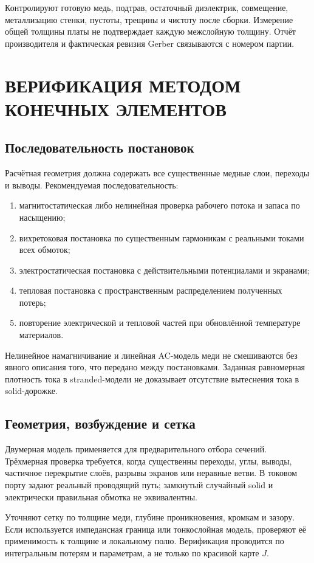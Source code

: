 \documentclass[14pt,a4paper]{extarticle}
\begin{document}
Контролируют готовую медь, подтрав, остаточный диэлектрик, совмещение, металлизацию стенки, пустоты, трещины и чистоту после сборки. Измерение общей толщины платы не подтверждает каждую межслойную толщину. Отчёт производителя и фактическая ревизия Gerber связываются с номером партии.

\section{ВЕРИФИКАЦИЯ МЕТОДОМ КОНЕЧНЫХ ЭЛЕМЕНТОВ}
\label{pl:fem}
\subsection{Последовательность постановок}
Расчётная геометрия должна содержать все существенные медные слои, переходы и выводы. Рекомендуемая последовательность:
\begin{enumerate}
\item магнитостатическая либо нелинейная проверка рабочего потока и запаса по насыщению;
\item вихретоковая постановка по существенным гармоникам с реальными токами всех обмоток;
\item электростатическая постановка с действительными потенциалами и экранами;
\item тепловая постановка с пространственным распределением полученных потерь;
\item повторение электрической и тепловой частей при обновлённой температуре материалов.
\end{enumerate}
Нелинейное намагничивание и линейная AC-модель меди не смешиваются без явного описания того, что передано между постановками. Заданная равномерная плотность тока в stranded-модели не доказывает отсутствие вытеснения тока в solid-дорожке.

\subsection{Геометрия, возбуждение и сетка}
Двумерная модель применяется для предварительного отбора сечений. Трёхмерная проверка требуется, когда существенны переходы, углы, выводы, частичное перекрытие слоёв, разрывы экранов или неравные ветви. В токовом порту задают реальный проводящий путь; замкнутый случайный solid и электрически правильная обмотка не эквивалентны.

Уточняют сетку по толщине меди, глубине проникновения, кромкам и зазору. Если используется импедансная граница или тонкослойная модель, проверяют её применимость к толщине и локальному полю. Верификация проводится по интегральным потерям и параметрам, а не только по красивой карте $J$.
\end{document}

